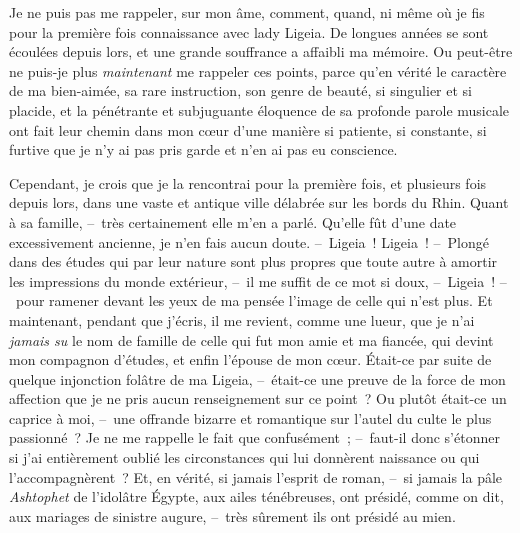 \documentclass[french,twoside]{book} %
\newcommand{\bibl}[1]{{\RaggedLeft{#1}\par\bigskip}}
\begin{document}
\bibl{Joseph Glanvill.}
\noindent Je ne puis pas me rappeler, sur mon âme, comment, quand, ni même où je fis pour la première fois connaissance avec lady Ligeia. De longues années se sont écoulées depuis lors, et une grande souffrance a affaibli ma mémoire. Ou peut-être ne puis-je plus \emph{maintenant} me rappeler ces points, parce qu’en vérité le caractère de ma bien-aimée, sa rare instruction, son genre de beauté, si singulier et si placide, et la pénétrante et subjuguante éloquence de sa profonde parole musicale ont fait leur chemin dans mon cœur d’une manière si patiente, si constante, si furtive que je n’y ai pas pris garde et n’en ai pas eu conscience.\par
Cependant, je crois que je la rencontrai pour la première fois, et plusieurs fois depuis lors, dans une vaste et antique ville délabrée sur les bords du Rhin. Quant à sa famille, – très certainement elle m’en a parlé. Qu’elle fût d’une date excessivement ancienne, je n’en fais aucun doute. – Ligeia ! Ligeia ! – Plongé dans des études qui par leur nature sont plus propres que toute autre à amortir les impressions du monde extérieur, – il me suffit de ce mot si doux, – Ligeia ! – pour ramener devant les yeux de ma pensée l’image de celle qui n’est plus. Et maintenant, pendant que j’écris, il me revient, comme une lueur, que je n’ai \emph{jamais su} le nom de famille de celle qui fut mon amie et ma fiancée, qui devint mon compagnon d’études, et enfin l’épouse de mon cœur. Était-ce par suite de quelque injonction folâtre de ma Ligeia, – était-ce une preuve de la force de mon affection que je ne pris aucun renseignement sur ce point ? Ou plutôt était-ce un caprice à moi, – une offrande bizarre et romantique sur l’autel du culte le plus passionné ? Je ne me rappelle le fait que confusément ; – faut-il donc s’étonner si j’ai entièrement oublié les circonstances qui lui donnèrent naissance ou qui l’accompagnèrent ? Et, en vérité, si jamais l’esprit de roman, – si jamais la pâle \emph{Ashtophet} de l’idolâtre Égypte, aux ailes ténébreuses, ont présidé, comme on dit, aux mariages de sinistre augure, – très sûrement ils ont présidé au mien.\par
\end{document}
